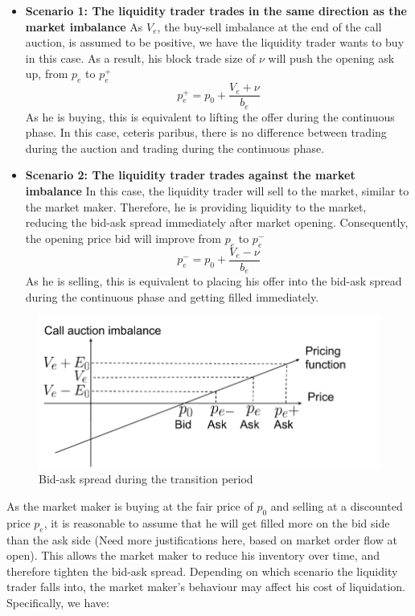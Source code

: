 \begin{itemize}
  \item {\textbf{Scenario 1: The liquidity trader trades in the same direction as the market imbalance}
        As $V_e$, the buy-sell imbalance at the end of the call auction, is assumed to be positive, we have the liquidity trader wants to buy in this case. As a result, his block trade size of $\nu$ will push the opening ask up, from $p_e$ to $p_e^+$
        \[
          p_e^+ =  p_0 + \frac{V_e + \nu}{b_e}
        \]
        As he is buying, this is equivalent to lifting the offer during the continuous phase. In this case, ceteris paribus, there is no difference between trading during the auction and trading during the continuous phase.
        }
  \item {
        \textbf{Scenario 2: The liquidity trader trades against the market imbalance}
        In this case, the liquidity trader will sell to the market, similar to the market maker. Therefore, he is providing liquidity to the market, reducing the bid-ask spread immediately after market opening. Consequently, the opening price bid will improve from $p_e$ to $p_e^-$
        \[
          p_e^- = p_0 + \frac{V_e - \nu}{b_e}
        \]
        As he is selling, this is equivalent to placing his offer into the bid-ask spread during the continuous phase and getting filled immediately.
        }
\end{itemize}

\begin{figure}[h]
  \includegraphics[width=\textwidth]{images/MMPricingTransitionPeriod}
  \caption{Bid-ask spread during the transition period}
  \label{fig:mm_pricing_transition_period}
\end{figure}

As the market maker is buying at the fair price of $p_0$ and selling at a discounted price $p_e$, it is reasonable to assume that he will get filled more on the bid side than the ask side {\color{red} (Need more justifications here, based on market order flow at open)}. This allows the market maker to reduce his inventory over time, and therefore tighten the bid-ask spread. Depending on which scenario the liquidity trader falls into, the market maker's behaviour may affect his cost of liquidation. Specifically, we have:

